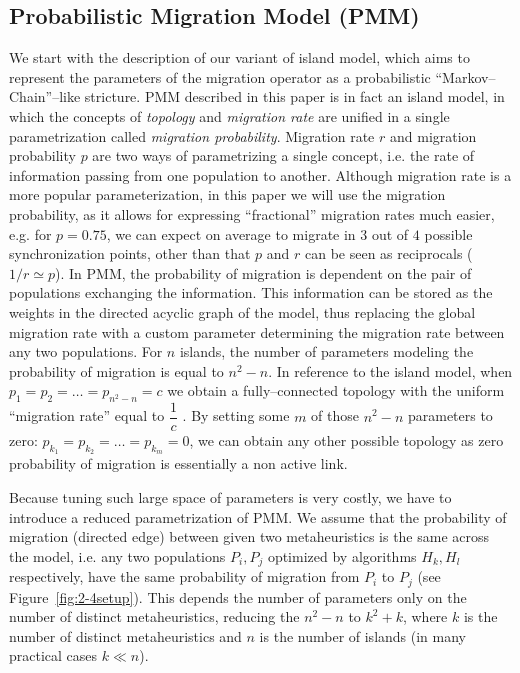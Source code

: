 \documentclass{sig-alternate}
\begin{document}
\subsection{Probabilistic Migration Model (PMM)}
    We start with the description of our variant of island model, which aims to represent the parameters of the migration operator as a probabilistic ``Markov--Chain''--like stricture.
    PMM described in this paper is in fact an island model, in which the concepts of \emph{topology} and \emph{migration rate} are unified in a single parametrization called \emph{migration probability}.
    Migration rate $r$ and migration probability $p$ are two ways of parametrizing a single concept, i.e. the rate of information passing from one population to another.%
    Although migration rate is a more popular parameterization, in this paper we will use the migration probability, as it allows for expressing ``fractional'' migration rates much easier, e.g. for $p=0.75$, we can expect on average to migrate in $3$ out of $4$ possible synchronization points, other than that $p$ and $r$ can be seen as reciprocals ($1/r \simeq p$).
    In PMM, the probability of migration is dependent on the pair of populations exchanging the information.
    This information can be stored as the weights in the directed acyclic graph of the model, thus replacing the global migration rate with a custom parameter determining the migration rate between any two populations.
    For $n$ islands, the number of parameters modeling the probability of migration is equal to $n^2 - n$.
    In reference to the island model, when $p_1=p_2=\ldots=p_{n^2-n}=c$ we obtain a fully--connected topology with the uniform ``migration rate'' equal to $\dfrac{1}{c}$ .
    By setting some $m$ of those $n^2-n$ parameters to zero: $p_{k_1} = p_{k_2} = \ldots = p_{k_m} = 0$, we can obtain any other possible topology as zero probability of migration is essentially a non active link.

    Because tuning such large space of parameters is very costly, we have to introduce a reduced parametrization of PMM.
    We assume that the probability of migration (directed edge) between given two metaheuristics is the same across the model, i.e. any two populations $P_i, P_j$ optimized by algorithms $H_k, H_l$ respectively, have the same probability of migration from $P_i$ to $P_j$ (see Figure~\ref{fig:2-4setup}).
    This depends the number of parameters only on the number of distinct metaheuristics, reducing the $n^2 - n$ to $k^2 + k$, where $k$ is the number of distinct metaheuristics and $n$ is the number of islands (in many practical cases $k \ll n$).
\end{document}

